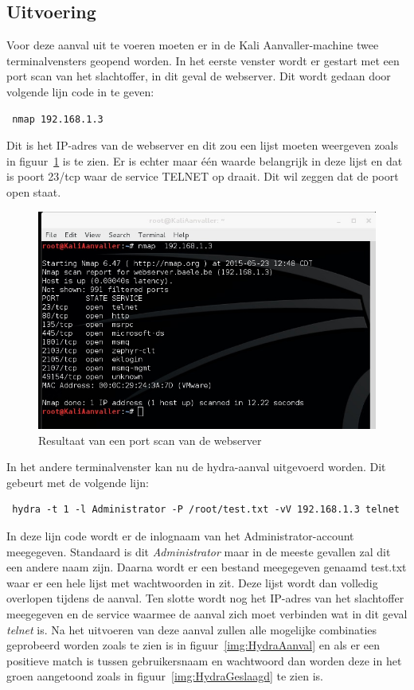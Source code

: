 \documentclass[pdftex,a4paper,12pt]{report}
\begin{document}
\subsection{Uitvoering}
Voor deze aanval uit te voeren moeten er in de Kali Aanvaller-machine twee terminalvensters geopend worden. In het eerste venster wordt er gestart met een port scan van het slachtoffer, in dit geval de webserver. Dit wordt gedaan door volgende lijn code in te geven:
\begin{verbatim} nmap 192.168.1.3 \end{verbatim}
Dit is het IP-adres van de webserver en dit zou een lijst moeten weergeven zoals in figuur~\ref{img:PortScan} is te zien. Er is echter maar één waarde belangrijk in deze lijst en dat is poort 23/tcp waar de service TELNET op draait. Dit wil zeggen dat de poort open staat.

\begin{figure}[H]
\begin{center}
\includegraphics[scale=0.60]{img/HydraPortscan}
\end{center}
\caption{Resultaat van een port scan van de webserver}
\label{img:PortScan}
\end{figure}

In het andere terminalvenster kan nu de hydra-aanval uitgevoerd worden. Dit gebeurt met de volgende lijn:
\begin{verbatim} hydra -t 1 -l Administrator -P /root/test.txt -vV 192.168.1.3 telnet \end{verbatim}
In deze lijn code wordt er de inlognaam van het Administrator-account meegegeven. Standaard is dit \textit{Administrator} maar in de meeste gevallen zal dit een andere naam zijn. Daarna wordt er een bestand meegegeven genaamd test.txt waar er een hele lijst met wachtwoorden in zit. Deze lijst wordt dan volledig overlopen tijdens de aanval. Ten slotte wordt nog het IP-adres van het slachtoffer meegegeven en de service waarmee de aanval zich moet verbinden wat in dit geval \textit{telnet} is. Na het uitvoeren van deze aanval zullen alle mogelijke combinaties geprobeerd worden zoals te zien is in figuur~\ref{img:HydraAanval} en als er een positieve match is tussen gebruikersnaam en wachtwoord dan worden deze in het groen aangetoond zoals in figuur~\ref{img:HydraGeslaagd} te zien is. \citep{Moon2013}
\end{document}
